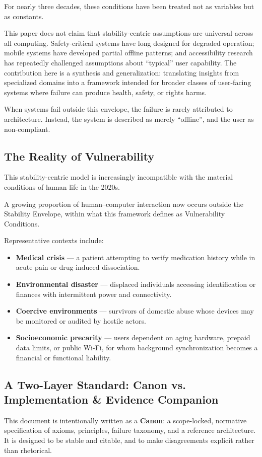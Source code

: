\documentclass[12pt]{article}
\begin{document}
For nearly three decades, these conditions have been treated not as variables but as constants.

This paper does not claim that stability-centric assumptions are universal across all computing. Safety-critical systems have long designed for degraded operation; mobile systems have developed partial offline patterns; and accessibility research has repeatedly challenged assumptions about ``typical'' user capability. The contribution here is a synthesis and generalization: translating insights from specialized domains into a framework intended for broader classes of user-facing systems where failure can produce health, safety, or rights harms.

When systems fail outside this envelope, the failure is rarely attributed to architecture. Instead, the system is described as merely ``offline'', and the user as non-compliant.

\subsection{The Reality of Vulnerability}
This stability-centric model is increasingly incompatible with the material conditions of human life in the 2020s.

A growing proportion of human--computer interaction now occurs outside the Stability Envelope, within what this framework defines as Vulnerability Conditions.

Representative contexts include:

\begin{itemize}
\item \textbf{Medical crisis} --- a patient attempting to verify medication history while in acute pain or drug-induced dissociation.
\item \textbf{Environmental disaster} --- displaced individuals accessing identification or finances with intermittent power and connectivity.
\item \textbf{Coercive environments} --- survivors of domestic abuse whose devices may be monitored or audited by hostile actors.
\item \textbf{Socioeconomic precarity} --- users dependent on aging hardware, prepaid data limits, or public Wi-Fi, for whom background synchronization becomes a financial or functional liability.
\end{itemize}

\subsection{A Two-Layer Standard: Canon vs. Implementation \& Evidence Companion}
This document is intentionally written as a \textbf{Canon}: a scope-locked, normative specification of axioms, principles, failure taxonomy, and a reference architecture. It is designed to be stable and citable, and to make disagreements explicit rather than rhetorical.
\end{document}
